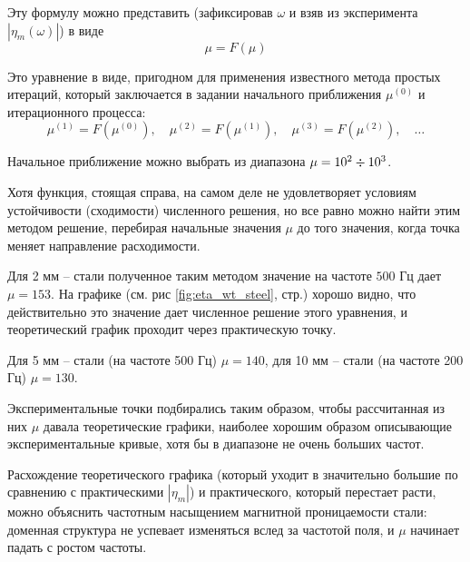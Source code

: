 \documentclass[a4paper,12pt]{article}
\begin{document}


Эту формулу можно представить (зафиксировав $\omega$ и взяв из эксперимента $|\eta_m(\omega)|$) в виде
\begin{equation}
	\mu=F(\mu)
\end{equation}

Это уравнение в виде, пригодном для применения известного метода простых итераций, который заключается в задании начального приближения $\mu^{(0)}$ и итерационного процесса:
\begin{equation}
	\mu^{(1)}=F(\mu^{(0)}),\quad
	\mu^{(2)}=F(\mu^{(1)}),\quad
	\mu^{(3)}=F(\mu^{(2)}),\quad\ldots
\end{equation}

Начальное приближение можно выбрать из диапазона $\mu=10^2 \divisionsymbol 10^3$.

Хотя функция, стоящая справа, на самом деле не удовлетворяет условиям устойчивости (сходимости) численного решения, но все равно можно найти этим методом решение, перебирая начальные значения $\mu$ до того значения, когда точка меняет направление расходимости. 

Для 2 мм -- стали полученное таким методом значение на частоте $500$ Гц дает $\mu=153$. На графике (см. рис \ref{fig:eta_wt_steel}, стр.\pageref{fig:eta_wt_steel}) хорошо видно, что действительно это значение дает численное решение этого уравнения, и теоретический график проходит через практическую точку.

Для 5 мм -- стали (на частоте 500 Гц) $\mu=140$, для 10 мм -- стали (на частоте 200 Гц) $\mu=130$.

Экспериментальные точки подбирались таким образом, чтобы рассчитанная из них $\mu$ давала теоретические графики, наиболее хорошим образом описывающие экспериментальные кривые, хотя бы в диапазоне не очень больших частот.


Расхождение теоретического графика (который уходит в значительно большие по сравнению с практическими $|\eta_m|$)  и практического, который перестает расти, можно объяснить частотным насыщением магнитной проницаемости стали: доменная структура не успевает изменяться вслед за частотой поля, и $\mu$ начинает падать с ростом частоты.
\end{document}
